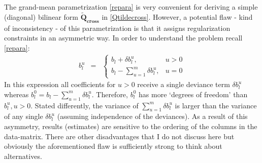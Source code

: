 \documentclass[11pt]{article}
\begin{document}
The grand-mean parametrization \ref{repara} is very convenient for deriving a simple (diagonal) bilinear form $\mathbf{\tilde{Q}_{cross}}$ in \ref{Qtildecross}. However, a potential flaw - kind of inconsistency - of this parametrization is that it assigns regularization constraints in an asymmetric way. In order to understand the problem recall \ref{repara}:
\begin{eqnarray*}
b_{l}^u&=&\left\{\begin{array} {cc}b_l+\delta b_l^u, &u>0\\
b_l-\sum_{u=1}^m\delta b_l^{u}, &u=0\end{array}\right.
\end{eqnarray*}
In this expression all coefficients for $u>0$ receive a single deviance term $\delta b_l^u$ whereas $b_{l}^0=b_l-\sum_{u=1}^m\delta b_l^{u}$. Therefore, $b_{l}^0$ has more `degrees of freedom' than $b_{l}^u, u>0$. Stated differently, the variance of $\sum_{u=1}^m\delta b_l^{u}$ is larger than the variance of any single $\delta b_l^{u}$ (assuming independence of the deviances). As a result of this asymmetry, results (estimates) are sensitive to the ordering of the columns in the data-matrix. There are other disadvantages that I do not discuss here but obviously the aforementioned flaw is sufficiently strong to think about alternatives.\\
\end{document}
